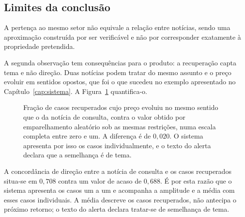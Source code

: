 \subsection{Limites da conclusão}

A pertença ao mesmo setor não equivale a relação entre notícias, sendo uma aproximação construída por
ser verificável e não por corresponder exatamente à propriedade pretendida.

A segunda observação tem consequências para o produto: a recuperação capta tema e não direção. Duas
notícias podem tratar do mesmo assunto e o preço evoluir em sentidos opostos, que foi o que sucedeu
no exemplo apresentado no Capítulo~\ref{cap:sistema}. A Figura~\ref{fig:av_direcao} quantifica-o.

\begin{figure}[htbp]
\centering
{}
\caption[Tema e direção não são a mesma propriedade]{Fração de casos recuperados cujo preço evoluiu
no mesmo sentido que o da notícia de consulta, contra o valor obtido por emparelhamento aleatório sob
as mesmas restrições, numa escala completa entre zero e um. A diferença é de $0{,}020$. O sistema apresenta por isso os casos
individualmente, e o texto do alerta declara que a semelhança é de tema.}
\label{fig:av_direcao}
\end{figure}

A concordância de direção entre a notícia de consulta e os casos recuperados situa-se em $0{,}708$
contra um valor de acaso de $0{,}688$. É por esta razão que o sistema apresenta os casos um a um e
acompanha a amplitude e a média com esses casos individuais. A média descreve os casos recuperados,
não antecipa o próximo retorno; o texto do alerta declara tratar-se de semelhança de tema.

